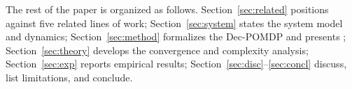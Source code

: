 The rest of the paper is organized as follows.
Section~\ref{sec:related} positions \method against five related lines of
work; Section~\ref{sec:system} states the system model and dynamics;
Section~\ref{sec:method} formalizes the Dec-POMDP and presents \method;
Section~\ref{sec:theory} develops the convergence and complexity analysis;
Section~\ref{sec:exp} reports empirical results;
Section~\ref{sec:disc}--\ref{sec:concl} discuss, list limitations, and
conclude.
